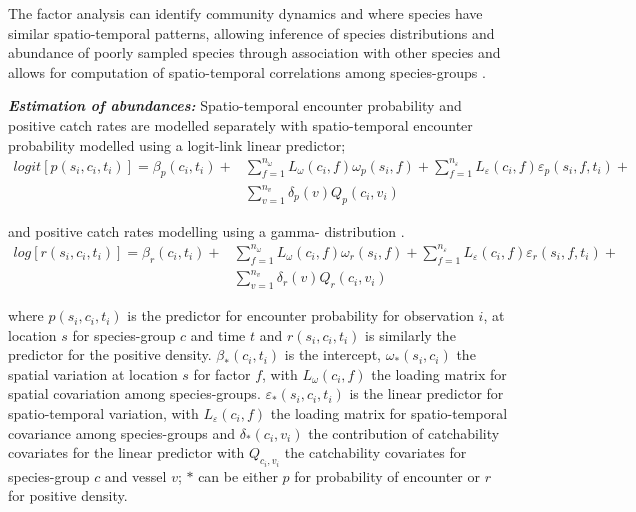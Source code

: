\documentclass{nature}
\begin{document}
The factor analysis can identify community dynamics and where species have
similar spatio-temporal patterns, allowing inference of species distributions
and abundance of poorly sampled species through association with other species
and allows for computation of spatio-temporal correlations among species-groups
\cite{Thorson2016b}.

\textbf{\textit{Estimation of abundances:}} Spatio-temporal encounter
probability and positive catch rates are modelled separately with
spatio-temporal encounter probability modelled using a logit-link linear
predictor;
		\begin{equation}
			\begin{split}
			logit[p(s_{i},c_{i},t_{i})] =	\beta_{p}(c_{i},t_{i}) +
			& \sum\limits_{f=1}^{n_{\omega}} L_{\omega}(c_{i},f)
			\omega_{p}(s_{i},f) + \sum\limits_{f=1}^{n_{\varepsilon}}
			L_{\varepsilon}(c_{i},f) \varepsilon_{p}(s_{i},f,t_{i}) + \\ 
			& \sum\limits_{v=1}^{n_{v}}\delta_{p}(v)Q_{p}(c_{i}, v_{i})
		\end{split}
		\end{equation}

and positive catch rates modelling using a gamma- distribution \cite{Thorson2015a}. 
		\begin{equation}
			\begin{split}
			log[r(s_{i},c_{i},t_{i})] = \beta_{r}(c_{i},t_{i}) +
			& \sum\limits_{f=1}^{n_{\omega}} L_{\omega}(c_{i},f)
			\omega_{r}(s_{i},f) +\sum\limits_{f=1}^{n_{\varepsilon}} 
			L_{\varepsilon}(c_{i},f) \varepsilon_{r}(s_{i},f,t_{i}) + \\
			& \sum\limits_{v=1}^{n_{v}}\delta_{r}(v) Q_{r}(c_{i}, v_{i})
			\end{split}
		\end{equation}

where $p(s_{i}, c_{i}, t_{i})$ is the predictor for encounter probability for
observation $i$, at location $s$ for species-group $c$ and time $t$ and
$r(s_{i}, c_{i}, t_{i})$ is similarly the predictor for the positive density.
$\beta_{*}(c_{i},t_{i})$ is the intercept, $\omega_{*}(s_{i},c_{i})$ the
spatial variation at location $s$ for factor $f$, with $L_{\omega}(c_{i},f)$
the loading matrix for spatial covariation among species-groups.
$\varepsilon_{*}(s_{i},c_{i},t_{i})$ is the linear predictor for
spatio-temporal variation, with $L_{\varepsilon}(c_{i}, f)$ the loading matrix
for spatio-temporal covariance among species-groups and $\delta_{*}(c_{i},
v_{i})$ the contribution of catchability covariates for the linear predictor
with $Q_{c_{i}, v_{i}}$ the catchability covariates for species-group $c$ and
vessel $v$;  $*$ can be either $p$ for probability of encounter or $r$ for
positive density.
\end{document}
